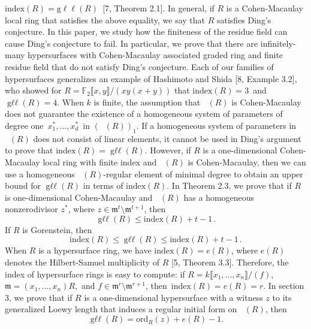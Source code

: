 \documentclass{amsart}
\theoremstyle{definition}
\theoremstyle{definition}
\DeclareMathOperator{\gr}{\text{gr}_{\mathfrak{m}}}
\DeclareMathOperator{\gll}{\text{g}\ell\ell}
\numberwithin{equation}{section}
\theoremstyle{definition}
\begin{document}
{$\text{index}(R)=\text{g}\ell\ell(R)$ \,[7, Theorem 2.1]. \text{}\newline\newline In general, if $R$ is a Cohen-Macaulay local ring that satisfies the above equality, we say that $R$ satisfies Ding's conjecture. In this paper, we study how the finiteness of the residue field can cause Ding's conjecture to fail. In particular, we prove that there are infinitely-many hypersurfaces with Cohen-Macaulay associated graded ring and finite residue field that do not satisfy Ding's conjecture. Each of our families of hypersurfaces generalizes an example of Hashimoto and Shida [8, Example 3.2], who showed for $R=\mathbb{F}_{2}\llbracket x,y \rrbracket/(xy(x+y))$ that $\text{index}(R)=3$\, and $\gll(R)=4$.\text{}\newline\newline 
When $k$ is finite, the assumption that $\gr(R)$ is Cohen-Macaulay does not guarantee the existence of a homogeneous system of parameters of degree one \,$x_{1}^{*},...,x_{d}^{*}$ \,in $(\gr(R))_{1}$. If a homogeneous system of parameters in $\gr(R)$ does not consist of linear elements, it cannot be used in Ding's argument to prove that $\text{index}(R)=\gll(R)$. \newline\newline However, if $R$ is a one-dimensional Cohen-Macaulay local ring with finite index and $\gr(R)$ is Cohen-Macaulay, then we can use a homogeneous $\gr(R)$-regular element of minimal degree to obtain an upper bound for $\gll(R)$ in terms of $\text{index}(R)$. In Theorem 2.3, we prove that if $R$ is one-dimensional Cohen-Macaulay and $\gr(R)$ has a homogeneous nonzerodivisor $z^{*}$, where $z \in \mathfrak{m}^{t} \setminus \mathfrak{m}^{t+1}$, then \newline
\[\gll(R) \leq \text{index}(R)+t-1\,. \]If $R$ is Gorenstein, then \[\text{index}(R) \leq \gll(R) \leq \text{index}(R)+t-1\,.\]\text{}\newline When $R$ is a hypersurface ring, we have $\text{index}(R)=e(R)$, where $e(R)$ denotes the Hilbert-Samuel multiplicity of $R$ [5, Theorem 3.3]. Therefore, the index of hypersurface rings is easy to compute: if $R=k\llbracket x_{1},...,x_{n}\rrbracket/(f)$, $\mathfrak{m}=(x_{1},...,x_{n})R$,\, and $f\in \mathfrak{m}^{r} \setminus \mathfrak{m}^{r+1}$, then\, $\text{index}(R)=e(R)=r$. \newline\newline In section 3, we prove that if $R$ is a one-dimensional hypersurface with a witness $z$ to its generalized Loewy length that induces a regular initial form on $\gr(R)$, then \newline \[ \gll(R)=\text{ord}_{R}(z)+e(R)-1.\] \text{}\newline
}
\end{document}
